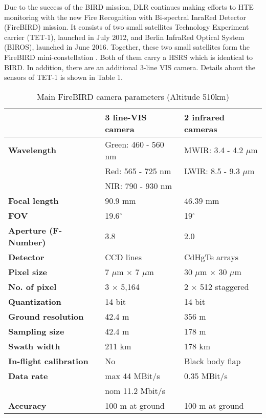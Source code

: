 \noindent Due to the success of the BIRD mission, DLR continues making efforts to HTE monitoring with the new Fire Recognition with Bi-spectral InraRed Detector (FireBIRD) mission. It consists of two small satellites Technology Experiment carrier (TET-1), launched in July 2012, and Berlin InfraRed Optical System (BIROS), launched in June 2016. Together, these two small satellites form the FireBIRD mini-constellation \parencite{Reference10}. Both of them carry a HSRS which is identical to BIRD. In addition, there are an additional 3-line VIS camera. Details about the sensors of TET-1 is shown in Table 1.\\

\begin{table}[!ht]
\caption{Main FireBIRD camera parameters (Altitude 510km) \parencite{Reference11}}
\centering
\begin{tabular} {l|l|l}
 \hline\hline
   & \textbf{3 line-VIS camera} & \textbf{2 infrared cameras} \\
 \hline
 \textbf{Wavelength} & Green: 460 - 560 nm  & MWIR: 3.4 - 4.2 $\mu$m \\
  & Red: 565 - 725 nm & LWIR: 8.5 - 9.3 $\mu$m \\
  & NIR: 790 - 930 nm & \\ 
 \hline
 \textbf{Focal length} & 90.9 mm & 46.39 mm \\
 \hline
 \textbf{FOV} & 19.6$^\circ$ & 19$^\circ$ \\
 \hline
 \textbf{Aperture (F-Number)} & 3.8 & 2.0 \\
 \hline
 \textbf{Detector} & CCD lines & CdHgTe arrays \\
 \hline
 \textbf{Pixel size} & 7 $\mu$m $\times$ 7 $\mu$m & 30 $\mu$m $\times$ 30 $\mu$m \\
 \hline
 \textbf{No. of pixel} & 3 $\times$ 5,164 & 2 $\times$ 512 staggered \\
 \hline
 \textbf{Quantization} & 14 bit & 14 bit \\
 \hline
 \textbf{Ground resolution} & 42.4 m & 356 m \\
 \hline
 \textbf{Sampling size} & 42.4 m & 178 m \\
 \hline
 \textbf{Swath width} & 211 km & 178 km \\
 \hline
 \textbf{In-flight calibration} & No & Black body flap \\
 \hline
 \textbf{Data rate} & max 44 MBit/s & 0.35 MBit/s \\
  & nom 11.2 Mbit/s & \\
 \hline
 \textbf{Accuracy} & 100 m at ground & 100 m at ground \\
 \hline\hline
\end{tabular}
\label{ParaFireBIRD}
\end{table}
   

